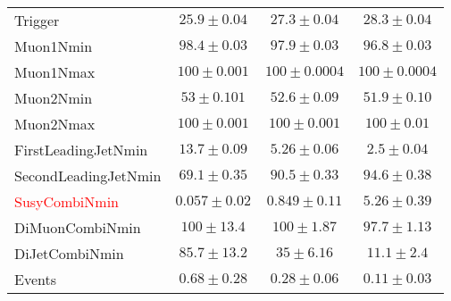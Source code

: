 \documentclass{beamer}
\begin{document}
\begin{frame}
\begin{table}[htbp]
{\begin{tabular}{lccc}
Trigger                             &       $25.9 \pm 0.04$ &    $27.3 \pm 0.04$ &    $28.3 \pm 0.04$ \\ 
 Muon1Nmin                   &      $98.4 \pm 0.03$ &     $97.9 \pm 0.03$ &     $96.8 \pm 0.03$ \\  
 Muon1Nmax                  &      $100 \pm 0.001$ &     $100 \pm 0.0004$ &     $100 \pm 0.0004$ \\  
 Muon2Nmin                   &      $53 \pm 0.101$ &     $52.6 \pm 0.09$ &     $51.9 \pm 0.10$ \\  
 Muon2Nmax                  &     $100 \pm 0.001$ &     $100 \pm 0.001$ &     $100 \pm 0.01$ \\  
 FirstLeadingJetNmin      &    $13.7 \pm 0.09$ &     $5.26 \pm 0.06$ &     $2.5 \pm 0.04$ \\  
 SecondLeadingJetNmin &    $69.1 \pm 0.35$ &     $90.5 \pm 0.33$ &     $94.6 \pm  0.38$ \\  
  \textcolor{red}{SusyCombiNmin}        &      $0.057 \pm 0.02$ &     $0.849 \pm 0.11$ &     $5.26 \pm 0.39$ \\  
 DiMuonCombiNmin        &   $100 \pm  13.4$ &     $100 \pm  1.87$ &     $97.7 \pm  1.13$ \\  
 DiJetCombiNmin             &   $85.7 \pm  13.2$ &     $35 \pm  6.16$ &     $11.1 \pm   2.4$ \\  
\hline
      Events &        $0.68 \pm  0.28$ &         $0.28 \pm  0.06$ &         $0.11 \pm  0.03$ \\ 
\hline \hline
\end{tabular}
}
\end{table}



 \end{frame}

 
\end{document}
